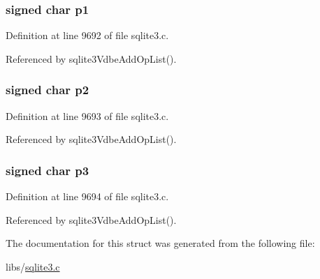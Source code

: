 \subsubsection[{p1}]{\setlength{\rightskip}{0pt plus 5cm}signed char p1}\label{struct_vdbe_op_list_afe6d13ea5cb534abc24487d50f1d57e4}


Definition at line 9692 of file sqlite3.\+c.



Referenced by sqlite3\+Vdbe\+Add\+Op\+List().

\hypertarget{struct_vdbe_op_list_ab590063439391b08f4e8168bb5fcae9e}{}
\subsubsection[{p2}]{\setlength{\rightskip}{0pt plus 5cm}signed char p2}\label{struct_vdbe_op_list_ab590063439391b08f4e8168bb5fcae9e}


Definition at line 9693 of file sqlite3.\+c.



Referenced by sqlite3\+Vdbe\+Add\+Op\+List().

\hypertarget{struct_vdbe_op_list_a0a6d80174d3bd39c3b901cf5582bb28c}{}
\subsubsection[{p3}]{\setlength{\rightskip}{0pt plus 5cm}signed char p3}\label{struct_vdbe_op_list_a0a6d80174d3bd39c3b901cf5582bb28c}


Definition at line 9694 of file sqlite3.\+c.



Referenced by sqlite3\+Vdbe\+Add\+Op\+List().



The documentation for this struct was generated from the following file\+:\begin{DoxyCompactItemize}
\item 
libs/\hyperlink{sqlite3_8c}{sqlite3.\+c}\end{DoxyCompactItemize}

